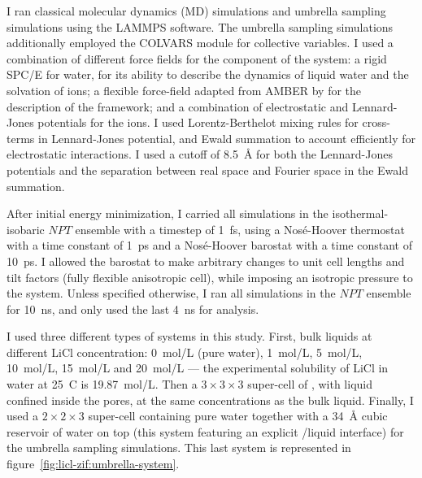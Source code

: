 \documentclass[thesis]{subfiles}
\begin{document}
I ran classical molecular dynamics (MD) simulations and umbrella sampling
simulations using the LAMMPS\cite{Plimpton1993} software. The umbrella sampling
simulations additionally employed the COLVARS\cite{Fiorin2013} module for
collective variables. I used a combination of different force fields for the
component of the system: a rigid SPC/E\cite{Berendsen1987} for water, for its
ability to describe the dynamics of liquid water and the solvation of ions; a
flexible force-field adapted from AMBER by
\citeauthor{Zheng2012}\cite{Zheng2012} for the description of the 
framework; and a combination of electrostatic and Lennard-Jones potentials for
the ions\cite{Chowdhuri2003}. I used Lorentz-Berthelot mixing rules for
cross-terms in Lennard-Jones potential, and Ewald summation to account
efficiently for electrostatic interactions. I used a cutoff of \SI{8.5}{\AA} for
both the Lennard-Jones potentials and the separation between real space and
Fourier space in the Ewald summation.

\newpage

After initial energy minimization, I carried all simulations in the
isothermal-isobaric $NPT$ ensemble with a timestep of \SI{1}{fs}, using a
Nosé-Hoover thermostat with a time constant of \SI{1}{ps} and a Nosé-Hoover
barostat with a time constant of \SI{10}{ps}. I allowed the barostat to make
arbitrary changes to unit cell lengths and tilt factors (fully flexible
anisotropic cell), while imposing an isotropic pressure to the system. Unless
specified otherwise, I ran all simulations in the $NPT$ ensemble for
\SI{10}{ns}, and only used the last \SI{4}{ns} for analysis.

I used three different types of systems in this study. First, bulk liquids at
different LiCl concentration: \SI{0}{mol/L} (pure water), \SI{1}{mol/L},
\SI{5}{mol/L}, \SI{10}{mol/L}, \SI{15}{mol/L} and \SI{20}{mol/L} --- the
experimental solubility of LiCl in water at 25~{\textdegree C} is
\SI{19.87}{mol/L}. Then a $3\times3\times3$ super-cell of , with liquid
confined inside the pores, at the same concentrations as the bulk liquid.
Finally, I used a $2\times2\times3$  super-cell containing pure water
together with a \SI{34}{\AA} cubic reservoir of water on top (this system
featuring an explicit /liquid interface) for the umbrella sampling
simulations. This last system is represented in
figure~\ref{fig:licl-zif:umbrella-system}.
\end{document}
